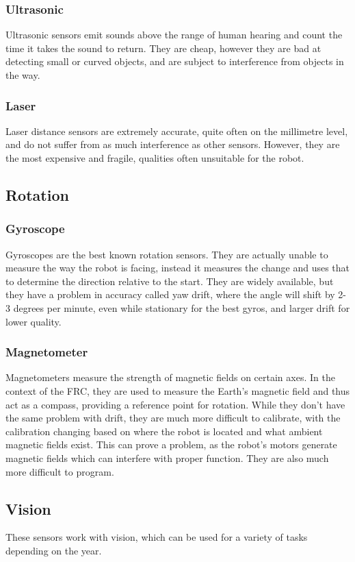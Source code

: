 \documentclass[]{report}
\begin{document}
	\subsubsection{Ultrasonic}
		Ultrasonic sensors emit sounds above the range of human hearing and count the time it takes the sound to return.
		They are cheap, however they are bad at detecting small or curved objects, and are subject to interference from objects in the way.
	\subsubsection{Laser}
		Laser distance sensors are extremely accurate, quite often on the millimetre level, and do not suffer from as much interference as other sensors. However, they are the most expensive and fragile, qualities often unsuitable for the robot.
\subsection{Rotation}
	\subsubsection{Gyroscope}
		Gyroscopes are the best known rotation sensors.
		They are actually unable to measure the way the robot is facing, instead it measures the change and uses that to determine the direction relative to the start.
		They are widely available, but they have a problem in accuracy called yaw drift, where the angle will shift by 2-3 degrees per minute, even while stationary for the best gyros, and larger drift for lower quality.
\subsubsection{Magnetometer}
		Magnetometers measure the strength of magnetic fields on certain axes.
		In the context of the FRC, they are used to measure the Earth's magnetic field and thus act as a compass, providing a reference point for rotation.
		While they don't have the same problem with drift, they are much more difficult to calibrate, with the calibration changing based on where the robot is located and what ambient magnetic fields exist.
		This can prove a problem, as the robot's motors generate magnetic fields which can interfere with proper function.
		They are also much more difficult to program.
\subsection{Vision}
	These sensors work with vision, which can be used for a variety of tasks depending on the year.
\end{document}
